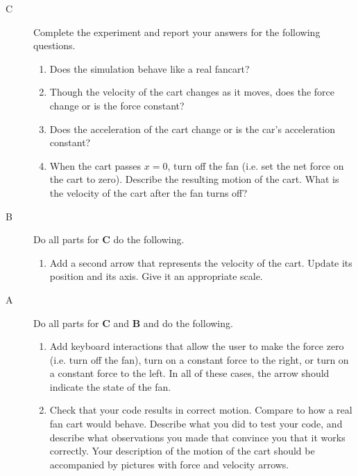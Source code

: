 \begin{description}

\item[C]  Complete the experiment and report your answers for the following questions.

\begin{enumerate}
	 \item Does the simulation behave like a real fancart?
	\item Though the velocity of the cart changes as it moves, does the force change or is the force constant?
	\item Does the acceleration of the cart change or is the car's acceleration constant?
	\item When the cart passes $x=0$, turn off the fan (i.e. set the net force on the cart to zero). Describe the resulting motion of the cart. What is the velocity of the cart after the fan turns off?
\end{enumerate}

\item[B] Do all parts for {\bf C} do the following.

\begin{enumerate}
 \item Add a second arrow that represents the velocity of the cart. Update its position and its axis. Give it an appropriate scale.
\end{enumerate}

\item[A] Do all parts for {\bf C} and {\bf B} and do the following.

\begin{enumerate}
 \item Add keyboard interactions that allow the user to make the force zero (i.e. turn off the fan), turn on a constant force to the right, or turn on a constant force to the left. In all of these cases, the arrow should indicate the state of the fan.
 \item Check that your code results in correct motion. Compare to how a real fan cart would behave. Describe what you did to test your code, and describe what observations you made that convince you that it works correctly. Your description of the motion of the cart should be accompanied by pictures with force and velocity arrows.
\end{enumerate}
\end{description}
